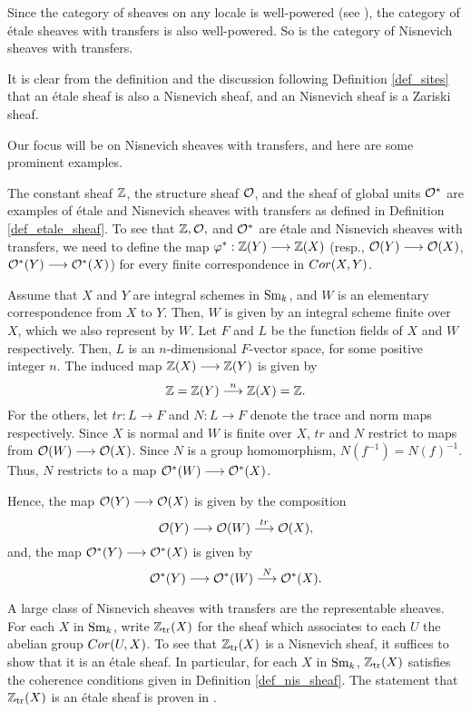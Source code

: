 Since the category of sheaves on any locale is well-powered
(see \cite[2.3.7]{Bo}), the category of \'etale sheaves 
with transfers is also well-powered. So is the category of 
Nisnevich sheaves with transfers.

It is clear from the definition and the discussion 
following Definition \ref{def_sites} that an \'etale sheaf is also 
a Nisnevich sheaf, and an Nisnevich sheaf is a Zariski sheaf.

Our focus will be on Nisnevich sheaves with transfers, and here 
are some prominent examples.

\begin{ex}\label{ex_Z_O_Ostar}
The constant sheaf $\mathbb{Z}$, the structure sheaf $\mathcal{O}$, and the sheaf
of global units $\mathcal{O}^*$ are examples of \'etale and Nisnevich sheaves
with transfers as defined in Definition
\ref{def_etale_sheaf}. To see that $\mathbb{Z}, \mathcal{O},$ and $\mathcal{O}^*$ are \'etale 
and Nisnevich sheaves with transfers, we need to define the map 
$\varphi^*: \mathbb{Z}(Y) \longrightarrow \mathbb{Z}(X)$ (resp., $\mathcal{O}(Y) \longrightarrow \mathcal{O}(X)$, $\mathcal{O}^*(Y) \longrightarrow 
\mathcal{O}^*(X)$) for every finite correspondence in $Cor(X, Y)$.

Assume that $X$ and $Y$ are integral schemes
in $\mathrm{Sm}_{k}$, and $W$ is an elementary correspondence from $X$ to $Y$. 
Then, $W$ is given by an integral scheme finite over $X$, which we 
also represent by $W$. Let $F$ and $L$ be the function fields of 
$X$ and $W$ respectively. Then, $L$ is an $n$-dimensional
$F$-vector space, for some positive integer $n$. The induced 
map $\mathbb{Z}(X) \longrightarrow \mathbb{Z}(Y)$ is given by
\[
\mathbb{Z} = \mathbb{Z}(Y) \stackrel{n}{\longrightarrow} \mathbb{Z}(X) = \mathbb{Z}.
\]
For the others, let $tr: L \to F$ and $N: L \to F$ denote the 
trace and norm maps respectively. Since $X$ is normal and $W$ is
finite over $X$, $tr$ and $N$ restrict to maps from $\mathcal{O}(W) \longrightarrow 
\mathcal{O}(X)$. Since $N$ is a group homomorphism, $N(f^{-1}) = 
N(f)^{-1}$. Thus, $N$ restricts to a map $\mathcal{O}^*(W) \longrightarrow \mathcal{O}^*(X)$.

Hence, the map $\mathcal{O}(Y) \longrightarrow \mathcal{O}(X)$ is given by the composition
\[
\mathcal{O}(Y) \longrightarrow \mathcal{O}(W) \stackrel{tr}{\longrightarrow} \mathcal{O}(X),
\]
and, the map $\mathcal{O}^*(Y) \longrightarrow \mathcal{O}^*(X)$ is given by
\[
\mathcal{O}^*(Y) \longrightarrow \mathcal{O}^*(W) \stackrel{N}{\longrightarrow} \mathcal{O}^*(X).
\]
\end{ex}

\begin{ex}\label{ex_ZtrX}
A large class of Nisnevich sheaves with transfers are the 
representable sheaves. For each $X$ in $\mathrm{Sm}_{k}$, write $\mathbb{Z}_{\mathrm{tr}}(X)$
for the sheaf which associates to each $U$ the abelian group
$Cor(U, X)$. To see that $\mathbb{Z}_{\mathrm{tr}}(X)$ is a Nisnevich sheaf, it
suffices to show that it is an \'etale sheaf. In particular,
for each $X$ in $\mathrm{Sm}_{k}$, $\mathbb{Z}_{\mathrm{tr}}(X)$ satisfies the coherence 
conditions given in Definition \ref{def_nis_sheaf}. The statement that
$\mathbb{Z}_{\mathrm{tr}}(X)$ is an \'etale sheaf is proven in \cite[6.2]{MVW}.
\end{ex}

